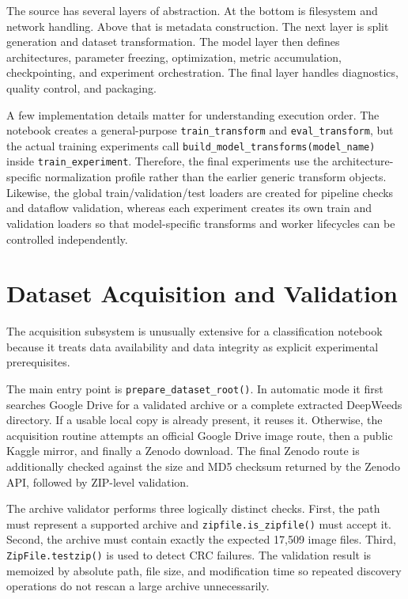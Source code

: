 \documentclass[11pt,a4paper]{article}
\begin{document}
The source has several layers of abstraction. At the bottom is filesystem and network handling. Above that is metadata construction. The next layer is split generation and dataset transformation. The model layer then defines architectures, parameter freezing, optimization, metric accumulation, checkpointing, and experiment orchestration. The final layer handles diagnostics, quality control, and packaging.

A few implementation details matter for understanding execution order. The notebook creates a general-purpose \texttt{train\_transform} and \texttt{eval\_transform}, but the actual training experiments call \texttt{build\_model\_transforms(model\_name)} inside \texttt{train\_experiment}. Therefore, the final experiments use the architecture-specific normalization profile rather than the earlier generic transform objects. Likewise, the global train/validation/test loaders are created for pipeline checks and dataflow validation, whereas each experiment creates its own train and validation loaders so that model-specific transforms and worker lifecycles can be controlled independently.

\section{Dataset Acquisition and Validation}
The acquisition subsystem is unusually extensive for a classification notebook because it treats data availability and data integrity as explicit experimental prerequisites.

The main entry point is \texttt{prepare\_dataset\_root()}. In automatic mode it first searches Google Drive for a validated archive or a complete extracted DeepWeeds directory. If a usable local copy is already present, it reuses it. Otherwise, the acquisition routine attempts an official Google Drive image route, then a public Kaggle mirror, and finally a Zenodo download. The final Zenodo route is additionally checked against the size and MD5 checksum returned by the Zenodo API, followed by ZIP-level validation.

The archive validator performs three logically distinct checks. First, the path must represent a supported archive and \texttt{zipfile.is\_zipfile()} must accept it. Second, the archive must contain exactly the expected 17,509 image files. Third, \texttt{ZipFile.testzip()} is used to detect CRC failures. The validation result is memoized by absolute path, file size, and modification time so repeated discovery operations do not rescan a large archive unnecessarily.
\end{document}
